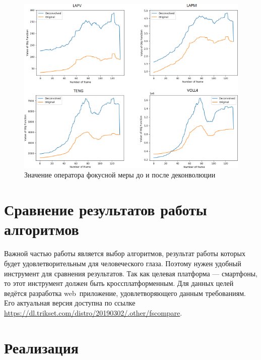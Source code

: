 \documentclass[14pt]{matmex-diploma-custom}
\begin{document}
\begin{figure}[h]
\centering
\includegraphics[width=1.0\textwidth]{figures/deconvolution2.png}
\caption{Значение оператора фокусной меры до и после деконволюции}
\label{deconvolution2}
\end{figure}


\section{Сравнение результатов работы алгоритмов}

Важной частью работы является выбор алгоритмов, результат работы которых будет удовлетворительным для человеческого глаза. Поэтому нужен удобный инструмент для сравнения результатов. Так как целевая платформа --- смартфоны, то этот инструмент должен быть кроссплатформенным. Для данных целей ведётся разработка web~приложение, удовлетворяющего данным требованиям. Его актуальная версия доступна по ссылке \url{https://dl.trikset.com/distro/20190302/.other/fscompare}.

\section{Реализация}


\setmonofont[Mapping=tex-text]{CMU Typewriter Text}


\end{document}
